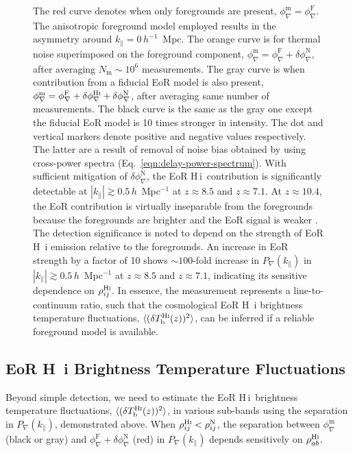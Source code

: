 \documentclass[
reprint,
superscriptaddress,
amsmath,
amssymb,
aps,
prd
]{revtex4-1}
\newcommand{\HI}{H\,{\sc i}}
\begin{document}
\begin{figure}[htb]
{The red curve denotes when only foregrounds are present, $\phi_\nabla^\textrm{m}=\phi_\nabla^\textrm{F}$. The anisotropic foreground model employed \cite{thy15a} results in the asymmetry around $k_\parallel=0\,h^{-1}$~Mpc. The orange curve is for thermal noise superimposed on the foreground component, $\phi_\nabla^\textrm{m}=\phi_\nabla^\textrm{F}+\delta\phi_\nabla^\textrm{N}$, after averaging $N_\textrm{m} \sim 10^6$ measurements. The gray curve is when contribution from a fiducial EoR model is also present, $\phi_\nabla^\textrm{m}=\phi_\nabla^\textrm{F}+\delta\phi_\nabla^\textrm{H{\sc i}}+\delta\phi_\nabla^\textrm{N}$, after averaging same number of measurements. The black curve is the same as the gray one except the fiducial EoR model is 10 times stronger in intensity. The dot and vertical markers denote positive and negative values respectively. The latter are a result of removal of noise bias obtained by using cross-power spectra (Eq.~\ref{eqn:delay-power-spectrum}). With sufficient mitigation of $\delta\phi_\nabla^\textrm{N}$, the EoR \HI\ contribution is significantly detectable at $|k_\parallel| \gtrsim 0.5\,h$~Mpc$^{-1}$ at $z\approx 8.5$ and $z\approx 7.1$. At $z\approx 10.4$, the EoR contribution is virtually inseparable from the foregrounds because the foregrounds are brighter and the EoR signal is weaker \cite[][see power spectrum amplitude of {\sc faint galaxies} model at $k=0.5$~Mpc$^{-1}$ in their Fig.~2]{gre17b}. The detection significance is noted to depend on the strength of EoR H~{\sc i} emission relative to the foregrounds. An increase in EoR strength by a factor of 10 shows $\sim 100$-fold increase in $P_\nabla(k_\parallel)$ in $|k_\parallel| \gtrsim 0.5\,h$~Mpc$^{-1}$ at $z\approx 8.5$ and $z\approx 7.1$, indicating its sensitive dependence on $\rho_{ij}^\textrm{H{\sc i}}$. In essence, the measurement represents a line-to-continuum ratio, such that the cosmological EoR H~{\sc i} brightness temperature fluctuations, $\langle(\delta T_\textrm{b}^\textrm{H{\sc i}}(z))^2\rangle$, can be inferred if a reliable foreground model is available. \label{fig:cpdps}}
\end{figure}

\subsection{EoR H~{\sc i} Brightness Temperature Fluctuations} \label{sec:Tb-variance}

Beyond simple detection, we need to estimate the EoR \HI\ brightness temperature fluctuations, $\langle(\delta T_\textrm{b}^\textrm{H{\sc i}}(z))^2\rangle$, in various sub-bands using the separation in $P_\nabla(k_\parallel)$, demonstrated above. When $\rho_{ij}^\textrm{H{\sc i}} < \rho_{ij}^\textrm{N}$, the separation between $\phi_\nabla^\textrm{m}$ (black or gray) and $\phi_\nabla^\textrm{F} + \delta\phi_\nabla^\textrm{N}$ (red) in $P_\nabla(k_\parallel)$ depends sensitively on $\rho_{ab}^\textrm{H{\sc i}}$.
\end{document}
